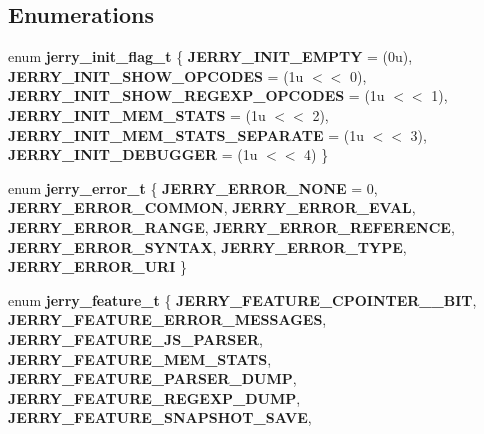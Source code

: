 \subsection*{Enumerations}
\begin{DoxyCompactItemize}
\item 
enum \textbf{ jerry\+\_\+init\+\_\+flag\+\_\+t} \{ \newline
\textbf{ J\+E\+R\+R\+Y\+\_\+\+I\+N\+I\+T\+\_\+\+E\+M\+P\+TY} = (0u), 
\textbf{ J\+E\+R\+R\+Y\+\_\+\+I\+N\+I\+T\+\_\+\+S\+H\+O\+W\+\_\+\+O\+P\+C\+O\+D\+ES} = (1u $<$$<$ 0), 
\textbf{ J\+E\+R\+R\+Y\+\_\+\+I\+N\+I\+T\+\_\+\+S\+H\+O\+W\+\_\+\+R\+E\+G\+E\+X\+P\+\_\+\+O\+P\+C\+O\+D\+ES} = (1u $<$$<$ 1), 
\textbf{ J\+E\+R\+R\+Y\+\_\+\+I\+N\+I\+T\+\_\+\+M\+E\+M\+\_\+\+S\+T\+A\+TS} = (1u $<$$<$ 2), 
\newline
\textbf{ J\+E\+R\+R\+Y\+\_\+\+I\+N\+I\+T\+\_\+\+M\+E\+M\+\_\+\+S\+T\+A\+T\+S\+\_\+\+S\+E\+P\+A\+R\+A\+TE} = (1u $<$$<$ 3), 
\textbf{ J\+E\+R\+R\+Y\+\_\+\+I\+N\+I\+T\+\_\+\+D\+E\+B\+U\+G\+G\+ER} = (1u $<$$<$ 4)
 \}
\item 
enum \textbf{ jerry\+\_\+error\+\_\+t} \{ \newline
\textbf{ J\+E\+R\+R\+Y\+\_\+\+E\+R\+R\+O\+R\+\_\+\+N\+O\+NE} = 0, 
\textbf{ J\+E\+R\+R\+Y\+\_\+\+E\+R\+R\+O\+R\+\_\+\+C\+O\+M\+M\+ON}, 
\textbf{ J\+E\+R\+R\+Y\+\_\+\+E\+R\+R\+O\+R\+\_\+\+E\+V\+AL}, 
\textbf{ J\+E\+R\+R\+Y\+\_\+\+E\+R\+R\+O\+R\+\_\+\+R\+A\+N\+GE}, 
\newline
\textbf{ J\+E\+R\+R\+Y\+\_\+\+E\+R\+R\+O\+R\+\_\+\+R\+E\+F\+E\+R\+E\+N\+CE}, 
\textbf{ J\+E\+R\+R\+Y\+\_\+\+E\+R\+R\+O\+R\+\_\+\+S\+Y\+N\+T\+AX}, 
\textbf{ J\+E\+R\+R\+Y\+\_\+\+E\+R\+R\+O\+R\+\_\+\+T\+Y\+PE}, 
\textbf{ J\+E\+R\+R\+Y\+\_\+\+E\+R\+R\+O\+R\+\_\+\+U\+RI}
 \}
\item 
enum \textbf{ jerry\+\_\+feature\+\_\+t} \{ \newline
\textbf{ J\+E\+R\+R\+Y\+\_\+\+F\+E\+A\+T\+U\+R\+E\+\_\+\+C\+P\+O\+I\+N\+T\+E\+R\+\_\+\_\+\+B\+IT}, 
\textbf{ J\+E\+R\+R\+Y\+\_\+\+F\+E\+A\+T\+U\+R\+E\+\_\+\+E\+R\+R\+O\+R\+\_\+\+M\+E\+S\+S\+A\+G\+ES}, 
\textbf{ J\+E\+R\+R\+Y\+\_\+\+F\+E\+A\+T\+U\+R\+E\+\_\+\+J\+S\+\_\+\+P\+A\+R\+S\+ER}, 
\textbf{ J\+E\+R\+R\+Y\+\_\+\+F\+E\+A\+T\+U\+R\+E\+\_\+\+M\+E\+M\+\_\+\+S\+T\+A\+TS}, 
\newline
\textbf{ J\+E\+R\+R\+Y\+\_\+\+F\+E\+A\+T\+U\+R\+E\+\_\+\+P\+A\+R\+S\+E\+R\+\_\+\+D\+U\+MP}, 
\textbf{ J\+E\+R\+R\+Y\+\_\+\+F\+E\+A\+T\+U\+R\+E\+\_\+\+R\+E\+G\+E\+X\+P\+\_\+\+D\+U\+MP}, 
\textbf{ J\+E\+R\+R\+Y\+\_\+\+F\+E\+A\+T\+U\+R\+E\+\_\+\+S\+N\+A\+P\+S\+H\+O\+T\+\_\+\+S\+A\+VE}, 
$$
\end{DoxyCompactItemize}
